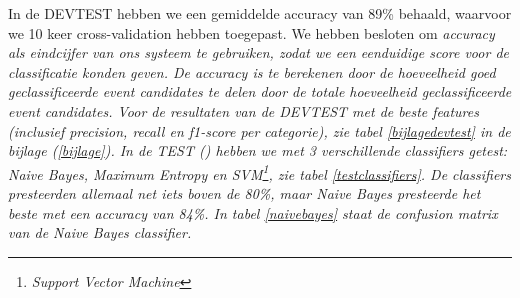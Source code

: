 {{In de DEVTEST hebben we een gemiddelde accuracy van 89\% behaald, waarvoor we 10 keer cross-validation hebben toegepast. We hebben besloten om \it{accuracy} als
eindcijfer van ons systeem te gebruiken, zodat we een eenduidige score voor de classificatie konden geven. De accuracy is te berekenen
door de hoeveelheid goed geclassificeerde event candidates te delen door de totale hoeveelheid geclassificeerde event candidates. Voor de resultaten van de DEVTEST met de beste 
features (inclusief \it{precision}, \it{recall} en \it{f1-score} per categorie), zie tabel \ref{bijlagedevtest} in de bijlage (\ref{bijlage}). 
\vl
In de TEST () hebben we met 3 verschillende classifiers getest: \it{Naive Bayes}, \it{Maximum Entropy} en
\it{SVM}\footnote{\it{Support Vector Machine}}, zie tabel \ref{testclassifiers}. De classifiers presteerden allemaal net iets boven de 80\%, maar Naive Bayes
presteerde het beste met een accuracy van 84\%. In tabel \ref{naivebayes} staat de confusion matrix van de Naive Bayes classifier.

}}

